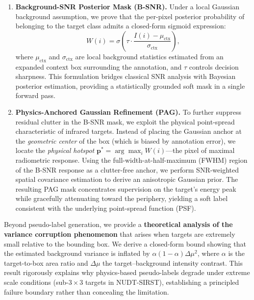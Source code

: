\begin{enumerate}
    \item \textbf{Background-SNR Posterior Mask (B-SNR).}
    Under a local Gaussian background assumption, we prove that the per-pixel posterior
    probability of belonging to the target class admits a closed-form sigmoid expression:
    \begin{equation}
        W(i) = \sigma\!\left(\tau \cdot \frac{I(i) - \mu_\mathrm{ctx}}{\sigma_\mathrm{ctx}}\right),
        \label{eq:bsnr}
    \end{equation}
    where $\mu_\mathrm{ctx}$ and $\sigma_\mathrm{ctx}$ are local background statistics
    estimated from an expanded context box surrounding the annotation, and $\tau$ controls
    decision sharpness.
    This formulation bridges classical SNR analysis with Bayesian posterior estimation,
    providing a statistically grounded soft mask in a single forward pass.

    \item \textbf{Physics-Anchored Gaussian Refinement (PAG).}
    To further suppress residual clutter in the B-SNR mask, we exploit the physical
    point-spread characteristic of infrared targets.
    Instead of placing the Gaussian anchor at the \emph{geometric center} of the box
    (which is biased by annotation error), we locate the \emph{physical hotspot}
    $\mathbf{p}^* = \arg\max_i W(i)$---the pixel of maximal radiometric response.
    Using the full-width-at-half-maximum (FWHM) region of the B-SNR response as a
    clutter-free anchor, we perform SNR-weighted spatial covariance estimation to derive
    an anisotropic Gaussian prior.
    The resulting PAG mask concentrates supervision on the target's energy peak while
    gracefully attenuating toward the periphery, yielding a soft label consistent with
    the underlying point-spread function (PSF).
\end{enumerate}

Beyond pseudo-label generation, we provide a \textbf{theoretical analysis of the
variance corruption phenomenon} that arises when targets are extremely small relative
to the bounding box.
We derive a closed-form bound showing that the estimated background variance is inflated
by $\alpha(1-\alpha)\Delta\mu^2$, where $\alpha$ is the target-to-box area ratio and
$\Delta\mu$ the target--background intensity contrast.
This result rigorously explains why physics-based pseudo-labels degrade under extreme
scale conditions (sub-$3\times3$ targets in NUDT-SIRST), establishing a principled
failure boundary rather than concealing the limitation.

